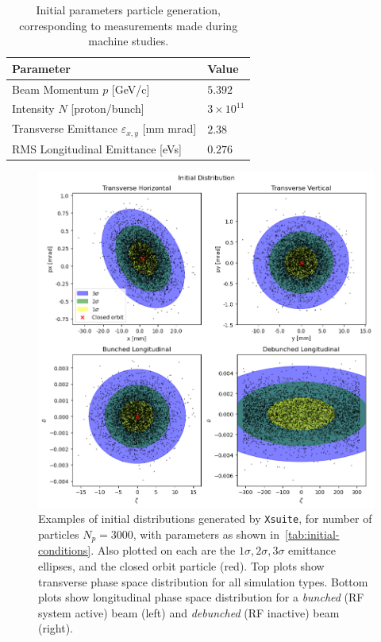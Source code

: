 \documentclass[11pt]{report}
\begin{document}
\begin{table}[]
  \centering
  \begin{tabular}{ll}
    \centering
  Parameter                                       & Value \\ \hline \hline
  Beam Momentum $p$ [GeV/c]                       & $5.392$ \\
  Intensity $N$ [proton/bunch]                    & $3\times10^{11}$ \\
  Transverse Emittance $\varepsilon_{x,y}$ [mm mrad]  & $2.38$ \\
  RMS Longitudinal Emittance [eVs]                & $0.276$
  \end{tabular}
  \caption{Initial parameters particle generation, corresponding to measurements made during machine studies.}\label{tab:initial-conditions}
\end{table}

\begin{figure}
  \centering
  \includegraphics*[width=\linewidth]{initial-dist.png}
  \cprotect\caption{Examples of initial distributions generated by \verb|Xsuite|, for number of particles $N_p=3000$, with parameters as shown in~\autoref{tab:initial-conditions}. Also plotted on each are the $1\sigma, 2\sigma, 3\sigma$ emittance ellipses, and the closed orbit particle (red). Top plots show transverse phase space distribution for all simulation types. Bottom plots show longitudinal phase space distribution for a \textit{bunched} (RF system active) beam (left) and \textit{debunched} (RF inactive) beam (right).}\label{fig:initial-dist}
\end{figure}
\end{document}
